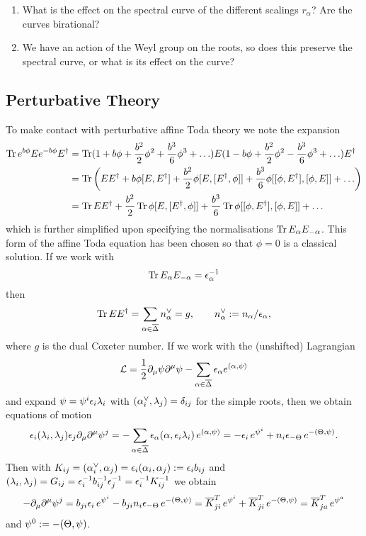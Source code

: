 \documentclass{article}
\begin{document}
\begin{enumerate}
	\item What is the effect on the spectral curve of the different scalings $r_\alpha$? Are the curves birational?
	\item We have an action of the Weyl group on the roots, so does this preserve the spectral curve, or what is its effect on the curve? 
\end{enumerate}

\subsection{Perturbative Theory}
To make contact with perturbative affine Toda theory we note the expansion
\begin{align*}
\tr e^{b\phi}E  e^{-b\phi} E\sp\dagger&=\tr
(1+b\phi+\frac{b^2}{2}\phi^2+\frac{b^3}{6}\phi^3+\ldots) E
(1-b\phi+\frac{b^2}{2}\phi^2-\frac{b^3}{6}\phi^3+\ldots) 
E\sp\dagger\\
&=\tr \left(E E\sp\dagger+b\phi[E,E\sp\dagger]+\frac{b^2}{2}\phi[ E,[ E\sp\dagger, \phi]]+
\frac{b^3}{6}\phi[ [\phi, E\sp\dagger], [\phi,E]]
+ \ldots
\right)\\
&= \tr E E\sp\dagger+\frac{b^2}{2}\tr \phi[ E,[ E\sp\dagger, \phi]]+ \frac{b^3}{6}\tr \phi[ [\phi, E\sp\dagger], [\phi,E]]+\ldots
\end{align*}
which is further simplified upon specifying the normalisations $ \tr E_\alpha E_{-\alpha}$. This form of the
affine Toda equation has been chosen so that $\phi=0$ is a classical solution. If we work with
$$\tr E_\alpha E_{-\alpha}=\epsilon_\alpha^{-1}
$$
then
$$ \tr E E\sp\dagger=\sum_{\alpha\in\bar\Delta}n_\alpha\sp\vee =g,\qquad  n_\alpha\sp\vee :=
n_\alpha/\epsilon_\alpha,$$
where $g$ is the dual Coxeter number. If we work with the (unshifted) Lagrangian
$$
\mathcal{L}= \frac12 \partial_\mu\psi \partial\sp\mu\psi -
\sum_{\alpha\in\bar\Delta}\epsilon_\alpha e\sp{(\alpha,\psi)}
$$
and expand $\psi=\psi\sp{i}\epsilon_i\lambda_i$ with $(\alpha_i\sp\vee,\lambda_j)=\delta_{ij}$ for the simple roots, then we obtain equations of motion
$$\epsilon_i(\lambda_i,\lambda_j)\epsilon_j \partial_\mu\partial\sp\mu\psi\sp{j}=-
\sum_{\alpha\in\bar\Delta}\epsilon_\alpha (\alpha, \epsilon_i\lambda_i)\, e\sp{(\alpha,\psi)}
= -\epsilon_i\, e\sp{\psi\sp{i}}+n_i \epsilon_{-\Theta }\,e\sp{-(\Theta,\psi)}.
$$
Then with $K_{ij}=(\alpha_i\sp{\vee},\alpha_j)=\epsilon_i (\alpha_i,\alpha_j):=\epsilon_i b_{ij}$ and
$(\lambda_i,\lambda_j)=G_{ij}=\epsilon_i\sp{-1}b_{ij}\sp{-1}\epsilon_j\sp{-1}=\epsilon_i\sp{-1}K_{ij}\sp{-1}$ we obtain
$$-\partial_\mu\partial\sp\mu\psi\sp{j}=b_{ji}\epsilon_i\, e\sp{\psi\sp{i}}-b_{ji}n_i \epsilon_{-\Theta }\,e\sp{-(\Theta,\psi)}
={\bar K}_{ji}\sp{T}\, e\sp{\psi\sp{i}}+{\bar K}_{ji}\sp{T}\, e\sp{-(\Theta,\psi)}
={\bar K}_{ja}\sp{T}\, e\sp{\psi\sp{a}}
$$
and $\psi\sp0:=-(\Theta,\psi)$.
\end{document}
